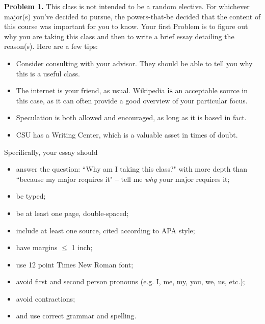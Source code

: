 \documentclass[12pt]{amsbook}
\begin{document}
\textbf{Problem 1.} This class is not intended to be a random elective. For whichever major(s) you've decided to pursue, the powers-that-be decided that the content of this course was important for you to know. Your first Problem is to figure out why you are taking this class and then to write a brief essay detailing the reason(s). Here are a few tips:
\begin{itemize}
\item Consider consulting with your advisor. They should be able to tell you why this is a useful class.
\item The internet is your friend, as usual. Wikipedia \textbf{is} an acceptable source in this case, as it can often provide a good overview of your particular focus.
\item Speculation is both allowed and encouraged, as long as it is based in fact.
\item CSU has a Writing Center, which is a valuable asset in times of doubt.
\end{itemize}
Specifically, your essay should
\begin{itemize}
\item answer the question: ``Why am I taking this class?" with more depth than ``because my major requires it" -- tell me \emph{why} your major requires it;
\item be typed;
\item be at least one page, double-spaced;
\item include at least one source, cited according to APA style;
\item have margins $\leq$ 1 inch;
\item use 12 point Times New Roman font;
\item avoid first and second person pronouns (e.g. I, me, my, you, we, us, etc.);
\item avoid contractions;
\item and use correct grammar and spelling.
\end{itemize}
\end{document}
